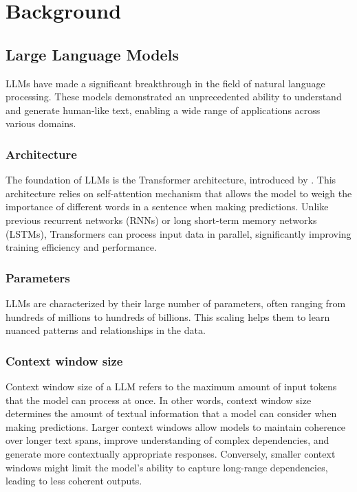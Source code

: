 \chapter{Background}

\section{Large Language Models}

LLMs have made a significant breakthrough in the field of natural language processing. These models demonstrated an unprecedented ability to understand and generate human-like text, enabling a wide range of applications across various domains.


\subsection{Architecture}

The foundation of LLMs is the Transformer architecture, introduced by \citet{Vaswani2017}. This architecture relies on self-attention mechanism that allows the model to weigh the importance of different words in a sentence when making predictions. Unlike previous recurrent networks (RNNs) or long short-term memory networks (LSTMs), Transformers can process input data in parallel, significantly improving training efficiency and performance.


\subsection{Parameters}

LLMs are characterized by their large number of parameters, often ranging from hundreds of millions to hundreds of billions. This scaling helps them to learn nuanced patterns and relationships in the data.


\subsection{Context window size}

Context window size of a LLM refers to the maximum amount of input tokens that the model can process at once. In other words, context window size determines the amount of textual information that a model can consider when making predictions. Larger context windows allow models to maintain coherence over longer text spans, improve understanding of complex dependencies, and generate more contextually appropriate responses. Conversely, smaller context windows might limit the model's ability to capture long-range dependencies, leading to less coherent outputs.


